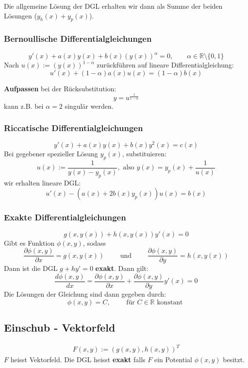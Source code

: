 \documentclass[a4paper]{article}
\newcommand{\R}{\mathbb{R}}
\begin{document}
Die allgemeine Lösung der DGL erhalten wir dann als Summe der beiden
Lösungen ($y_h(x) + y_p(x)$).

\subsubsection{Bernoullische Differentialgleichungen}
\[
	y' (x) + a(x) y(x) + b(x) (y(x)) ^{\alpha} = 0,
	\qquad \alpha \in \R \setminus \{
		0, 1
	\} 
\] 
Nach $u(x) := (y(x)) ^{1 - \alpha}$ zurückführen auf lineare
Differentialgleichung:
\[
	u'(x) + (1 - \alpha) a(x) u(x) = (1 - \alpha) b(x)
\] 

\textbf{Aufpassen} bei der Rücksubstitution:
\[
y = u ^{\frac{ 1 }{ 1- \alpha }}
\] 
kann z.B. bei $\alpha = 2$ singulär werden.

\subsubsection{Riccatische Differentialgleichungen}
\[
	y' (x) + a(x) y(x) + b(x) y ^2 (x) = c(x)
\] 
Bei gegebener spezieller Lösung $y_p (x)$, substituieren:
\[
	u(x) := \frac{ 1 }{ y(x) - y_p (x) }, \text{ also }
	y(x) = y_p (x) + \frac{ 1 }{ u(x) }
\] 
wir erhalten lineare DGL:
\[
	u' (x) - \left(
		a(x) + 2b (x) y_p (x)
	\right) u(x) = b(x)
\] 

\subsubsection{Exakte Differentialgleichungen}
\[
	g(x, y(x)) + h(x, y(x)) y' (x) = 0
\] 
Gibt es Funktion $\phi(x, y)$, sodass
\[
	\frac{ \partial \phi (x,y) }{ \partial x } = 
	g(x, y(x))
	\qquad
	\text{ und }
	\qquad
	\frac{ \partial \phi (x,y) }{ \partial y } = 
	h(x, y(x))
\] 
Dann ist die DGL $g + hy' = 0$ \textbf{exakt}.
Dann gilt:
\[
	\frac{ d \phi (x, y) }{ dx }
	= 
	\frac{ \partial \phi (x,y) }{ \partial x }
	+
	\frac{ \partial \phi (x,y) }{ \partial y } y' (x) = 0
\] 
Die Lösungen der Gleichung sind dann gegeben durch:
\[
	\phi (x, y) = C, \qquad
	\text{ für } C \in \R \text{ konstant }
\] 

\subsection{Einschub - Vektorfeld}
\begin{align*}
	F(x, y) := \left(
		g(x, y), h(x, y)
	\right) ^{T}
\end{align*}
$F$ heisst Vektorfeld. Die DGL heisst \textbf{exakt} falls $F$
ein Potential $\phi(x, y)$ besitzt.
\end{document}
